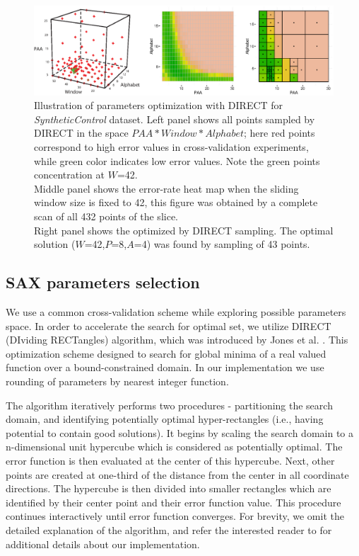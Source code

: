 \documentclass{llncs}
\newcommand{\myfigureshrinker}{\vspace{-1cm}}
\begin{document}
\begin{figure}[t]
   \myfigureshrinker
   \centering
   \includegraphics[width=115mm]{figures/figure_direct.eps}
   \caption{Illustration of parameters optimization with DIRECT 
   for \textit{SyntheticControl} dataset. 
   Left panel shows all points sampled by DIRECT in the space $PAA*Window*Alphabet$; here
   red points correspond to high error values in cross-validation experiments, while green color 
   indicates low error values. Note the green points concentration at $W$=42.\\ 
   Middle panel shows the error-rate heat map when the sliding window size is fixed to 42, 
   this figure was obtained by a complete scan of all 432 points of the slice.\\ 
   Right panel shows the optimized by DIRECT sampling. The optimal solution 
   ($W$=42,$P$=8,$A$=4) was found by sampling of 43 points.}
   \label{fig:direct-sampling}
\end{figure}

\subsection{SAX parameters selection} \label{section-direct}
We use a common cross-validation scheme while exploring possible parameters space. 
In order to accelerate the search for optimal set, 
we utilize DIRECT (DIviding RECTangles) algorithm, which 
was introduced by Jones et al. \cite{direct-original}. This optimization scheme 
designed to search for global minima of a real valued function over a bound-constrained domain. 
In our implementation we use rounding of parameters by nearest integer function.

The algorithm iteratively performs two procedures - partitioning the search domain, 
and identifying potentially optimal hyper-rectangles (i.e., having potential to contain good
solutions). 
It begins by scaling the search domain to a n-dimensional unit hypercube which is considered 
as potentially optimal. The error function is then evaluated at the center of this hypercube. Next, 
other points are created at one-third of the distance from the center in all coordinate directions. 
The hypercube is then divided into smaller rectangles which are identified by their center point 
and their error function value. This procedure continues interactively until error function
converges.
For brevity, we omit the detailed explanation of the algorithm, and refer the 
interested reader to \cite{direct} for additional details about our implementation.
\end{document}
